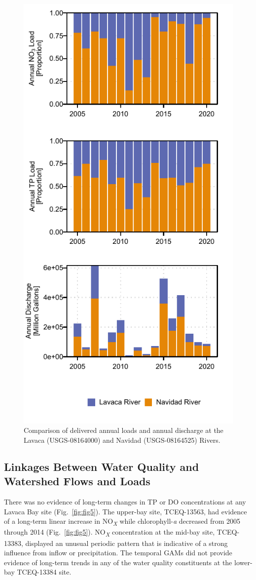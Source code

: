 \documentclass[fleqn,10pt,lineno]{wlpeerj} %
\providecommand{\DIFaddbeginFL}{} %
\providecommand{\DIFaddendFL}{} %
\providecommand{\DIFdelbeginFL}{} %
\providecommand{\DIFdelendFL}{} %
\begin{document}
\begin{figure}

{\centering \DIFdelbeginFL %
\DIFdelendFL \DIFaddbeginFL \includegraphics[width=0.5\linewidth,]{Schramm-2023-08-PeerJ_files/figure-latex/fig4} 
\DIFaddendFL 

}

\caption{Comparison of delivered annual loads and annual discharge at the Lavaca (USGS-08164000) and Navidad (USGS-08164525) Rivers.}\label{fig:fig4}
\end{figure}

\hypertarget{linkages-between-water-quality-and-watershed-flows-and-loads}{%
\subsection*{Linkages Between Water Quality and Watershed Flows and
Loads}\label{linkages-between-water-quality-and-watershed-flows-and-loads}}

There was no evidence of long-term changes in TP or DO concentrations at
any Lavaca Bay site (Fig.~\ref{fig:fig5}). The upper-bay site,
TCEQ-13563, had evidence of a long-term linear increase in
NO\textsubscript{\emph{X}} while chlorophyll-\emph{a} decreased from
2005 through 2014 (Fig.~\ref{fig:fig5}). NO\textsubscript{\emph{X}}
concentration at the mid-bay site, TCEQ-13383, displayed an unusual
periodic pattern that is indicative of a strong influence from inflow or
precipitation. The temporal GAMs did not provide evidence of long-term
trends in any of the water quality constituents at the lower-bay
TCEQ-13384 site.
\end{document}
